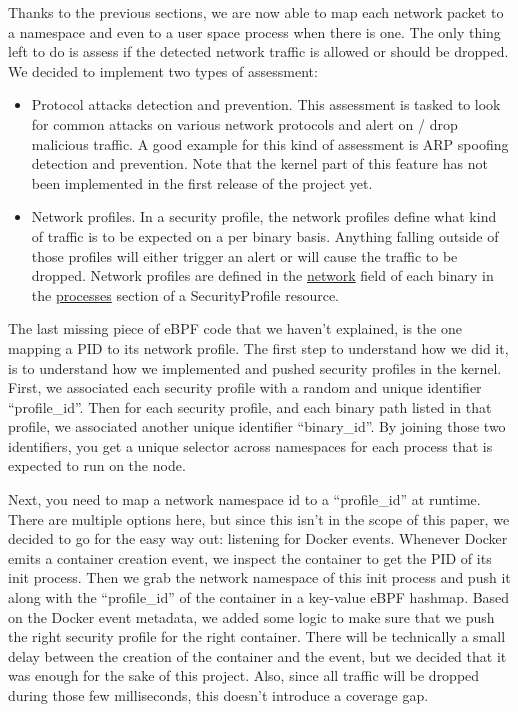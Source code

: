 Thanks to the previous sections, we are now able to map each network packet to a namespace and even to a user space process when there is one. The only thing left to do is assess if the detected network traffic is allowed or should be dropped. We decided to implement two types of assessment:
\begin{itemize}
  \item Protocol attacks detection and prevention. This assessment is tasked to look for common attacks on various network protocols and alert on / drop malicious traffic. A good example for this kind of assessment is ARP spoofing detection and prevention. Note that the kernel part of this feature has not been implemented in the first release of the project yet.
  \item Network profiles. In a security profile, the network profiles define what kind of traffic is to be expected on a per binary basis. Anything falling outside of those profiles will either trigger an alert or will cause the traffic to be dropped. Network profiles are defined in the \url{network} field of each binary in the \url{processes} section of a SecurityProfile resource.
\end{itemize}

The last missing piece of eBPF code that we haven’t explained, is the one mapping a PID to its network profile. The first step to understand how we did it, is to understand how we implemented and pushed security profiles in the kernel. First, we associated each security profile with a random and unique identifier “profile\_id”. Then for each security profile, and each binary path listed in that profile, we associated another unique identifier “binary\_id”. By joining those two identifiers, you get a unique selector across namespaces for each process that is expected to run on the node.

Next, you need to map a network namespace id to a “profile\_id” at runtime. There are multiple options here, but since this isn’t in the scope of this paper, we decided to go for the easy way out: listening for Docker events. Whenever Docker emits a container creation event, we inspect the container to get the PID of its init process. Then we grab the network namespace of this init process and push it along with the “profile\_id” of the container in a key-value eBPF hashmap. Based on the Docker event metadata, we added some logic to make sure that we push the right security profile for the right container. There will be technically a small delay between the creation of the container and the event, but we decided that it was enough for the sake of this project. Also, since all traffic will be dropped during those few milliseconds, this doesn’t introduce a coverage gap.

